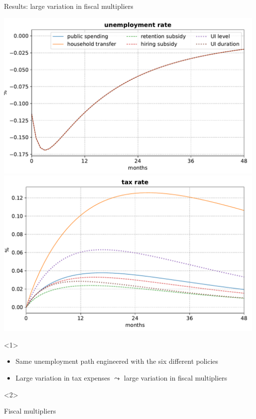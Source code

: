 \documentclass[aspectratio=169]{beamer}
\begin{document}
\begin{frame}{Results: large variation in fiscal multipliers}

    \includegraphics[scale=0.3]{results/pol_baseline_u_titled.pdf}
    \hfill
    \includegraphics[scale=0.3]{results/pol_baseline_tau_titled.pdf}

    \begin{onlyenv}<1>
		\begin{itemize}
			\item Same unemployment path engineered with the six different policies
			\item Large variation in tax expenses $\leadsto$ large variation in fiscal multipliers
		\end{itemize}
    \end{onlyenv}
    \begin{onlyenv}<2>
        \begin{block}{Fiscal multipliers}
        \begin{center}
        
        \end{center}
    \end{block}
    \end{onlyenv}
\end{frame}
\end{document}
